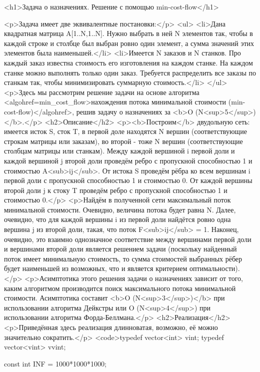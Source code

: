 <h1>Задача о назначениях. Решение с помощью min-cost-flow</h1>

<p>Задача имеет две эквивалентные постановки:</p>
<ul>
<li>Дана квадратная матрица A[1..N,1..N]. Нужно выбрать в ней N элементов так, чтобы в каждой строке и столбце был выбран ровно один элемент, а сумма значений этих элементов была наименьшей.</li>
<li>Имеется N заказов и N станков. Про каждый заказ известна стоимость его изготовления на каждом станке. На каждом станке можно выполнять только один заказ. Требуется распределить все заказы по станкам так, чтобы минимизировать суммарную стоимость.</li>
</ul>
<p>Здесь мы рассмотрим решение задачи на основе алгоритма <algohref=min_cost_flow>нахождения потока минимальной стоимости (min-cost-flow)</algohref>, решив задачу о назначениях за <b>O (N<sup>5</sup>)</b>.</p>
<h2>Описание</h2>
<p><b>Построим</b> двудольную сеть: имеется исток S, сток T, в первой доле находятся N вершин (соответствующие строкам матрицы или заказам), во второй - тоже N вершин (соответствующие столбцам матрицы или станкам). Между каждой вершиной i первой доли и каждой вершиной j второй доли проведём ребро с пропускной способностью 1 и стоимостью A<sub>ij</sub>. От истока S проведём рёбра ко всем вершинам i первой доли с пропускной способностью 1 и стоимостью 0. От каждой вершины второй доли j к стоку T проведём ребро с пропускной способностью 1 и стоимостью 0.</p>
<p>Найдём в полученной сети максимальный поток минимальной стоимости. Очевидно, величина потока будет равна N. Далее, очевидно, что для каждой вершины i из первой доли найдётся ровно одна вершина j из второй доли, такая, что поток F<sub>ij</sub> = 1. Наконец, очевидно, это взаимно однозначное соответствие между вершинами первой доли и вершинами второй доли является решением задачи (поскольку найденный поток имеет минимальную стоимость, то сумма стоимостей выбранных рёбер будет наименьшей из возможных, что и является критерием оптимальности).</p>
<p>Асимптотика этого решения задачи о назначениях зависит от того, каким алгоритмом производится поиск максимального потока минимальной стоимости. Асимптотика составит <b>O (N<sup>3</sup>)</b> при использовании алгоритма Дейкстры или O (N<sup>4</sup>) при использовании алгоритма Форда-Беллмана.</p>
<h2>Реализация</h2>
<p>Приведённая здесь реализация длинноватая, возможно, её можно значительно сократить.</p>
<code>typedef vector<int> vint;
typedef vector<vint> vvint;

const int INF = 1000*1000*1000;


